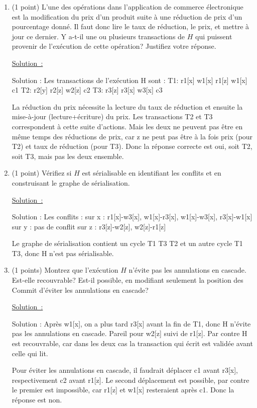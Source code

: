 \documentclass[french]{article}
\newenvironment{solution}{\nopagebreak\par\vspace*{2mm}\underline{Solution~:}\em\par}{\par\vspace*{2mm}}
\begin{document}
\begin{enumerate}
  \item (1 point) L'une des opérations dans l'application de commerce
  électronique est la modification du prix d'un produit suite à une réduction
  de prix d'un pourcentage donné. Il faut donc lire le taux de réduction,
      le prix, et mettre à jour ce dernier. 
 Y a-t-il une ou plusieurs transactions
  de $H$ qui puissent provenir de l'exécution de cette opération? Justifiez votre
  réponse.

\begin{solution}
      Solution : Les transactions de l'exécution H sont :
      T1: r1[x] w1[x] r1[z] w1[x] c1
      T2: r2[y] r2[z] w2[z] c2
      T3: r3[z] r3[x] w3[x] c3

      La réduction du prix nécessite la lecture du taux de réduction et ensuite
      la mise-à-jour (lecture+écriture) du prix. Les transactions T2 et T3
      correspondent à cette suite d'actions. Mais les deux ne peuvent pas être
      en même temps des réductions de prix, car z ne peut pas être à la fois
      prix (pour T2) et taux de réduction (pour T3). Donc la réponse correcte
      est oui, soit T2, soit T3, mais pas les deux ensemble.
\end{solution}
  \item  (1 point) Vérifiez si $H$ est sérialisable en identifiant les conflits et en construisant le graphe de sérialisation.
\begin{solution}
      Solution : Les conflits :
      sur x : r1[x]-w3[x], w1[x]-r3[x], w1[x]-w3[x], r3[x]-w1[x]
      sur y : pas de conflit
      sur z : r3[z]-w2[z], w2[z]-r1[z]

      Le graphe de sérialisation contient un cycle T1 T3 T2 et un autre cycle T1 T3, donc H n'est pas sérialisable.
\end{solution}

  \item (1 points) Montrez que l'exécution $H$ n'évite pas les annulations en
cascade. Est-elle recouvrable? Est-il possible, en modifiant seulement la
position des Commit d'éviter les annulations en cascade?
\begin{solution}
      Solution : Après w1[x], on a plus tard r3[x] avant la fin de T1, donc H
      n'évite pas les annulations en cascade. Pareil pour w2[z] suivi de
      r1[z]. Par contre H est recouvrable, car dans les deux cas la transaction
      qui écrit est validée avant celle qui lit.

      Pour éviter les annulations en cascade, il faudrait déplacer c1 avant
      r3[x], respectivement c2 avant r1[z]. Le second déplacement est possible,
      par contre le premier est impossible, car r1[z] et w1[x] resteraient
      après c1. Donc la réponse est non.
\end{solution}


\end{enumerate}
\end{document}
